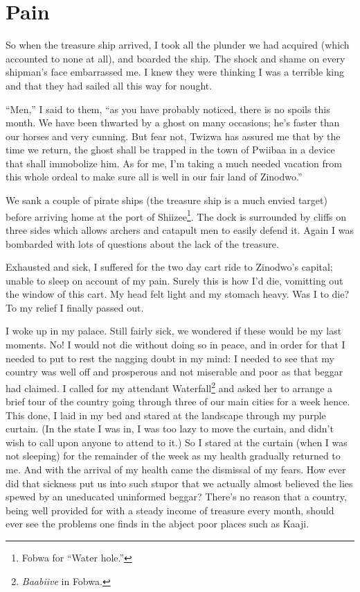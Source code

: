 \chapter{Pain}

So when the treasure ship arrived, I took all the plunder we had acquired (which accounted to none at all), and boarded the ship.
The shock and shame on every shipman's face embarrassed me. I knew they were thinking I was a terrible king and that they had sailed all this way for nought.

``Men,'' I said to them, ``as you have probably noticed, there is no spoils this month. We have been thwarted by a ghost on many occasions; he's faster than our horses and very cunning.
But fear not, Twizwa has assured me that by the time we return, the ghost shall be trapped in the town of Pwiibaa in a device that shall immobolize him.
As for me, I'm taking a much needed vacation from this whole ordeal to make sure all is well in our fair land of Zinodwo.''

We sank a couple of pirate ships (the treasure ship is a much envied target) before arriving home at the port of Shiizee\footnote{Fo\-bwa for ``Water hole.''}. The dock is surrounded by cliffs on three sides which allows archers and catapult men to easily defend it. Again I was bombarded with lots of questions about the lack of the treasure.

Exhausted and sick, I suffered for the two day cart ride to Zinodwo's capital; unable to sleep on account of my pain. Surely this is how I'd die, vomitting out the window of this cart. My head felt light and my stomach heavy. Was I to die? To my relief I finally passed out.

I woke up in my palace. Still fairly sick, we wondered if these would be my last moments. No! I would not die without doing so in peace, and in order for that I needed to put to rest the nagging doubt in my mind: I needed to see that my country was well off and prosperous and not miserable and poor as that beggar had claimed. I called for my attendant Waterfall\footnote{\emph{Baabiive} in Fobwa.} and asked her to arrange a brief tour of the country going through three of our main cities for a week hence. This done, I laid in my bed and stared at the landscape through my purple curtain. (In the state I was in, I was too lazy to move the curtain, and didn't wish to call upon anyone to attend to it.) So I stared at the curtain (when I was not sleeping) for the remainder of the week as my health gradually returned to me. And with the arrival of my health came the dismissal of my fears. How ever did that sickness put us into such stupor that we actually almost believed the lies spewed by an uneducated uninformed beggar? There's no reason that a country, being well provided for with a steady income of treasure every month, should ever see the problems one finds in the abject poor places such as Kaaji.

